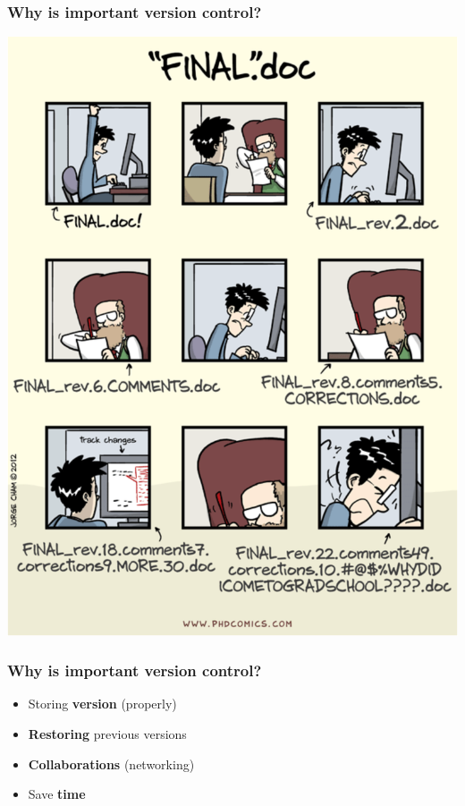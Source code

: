 \documentclass{beamer}
\begin{document}
\begin{frame}
\frametitle{Why is important version control?}
\begin{center}
\includegraphics[scale=0.29]{img/phd_comics.png}
\end{center}
\end{frame}


\begin{frame}
\frametitle{Why is important version control?}
\begin{itemize}
    \item Storing \textbf{version} (properly) \hfill \break
    \item \textbf{Restoring} previous versions \hfill \break
    \item \textbf{Collaborations} (networking) \hfill \break
    \item Save \textbf{time} \hfill \break
\end{itemize}
\end{frame}
\end{document}
